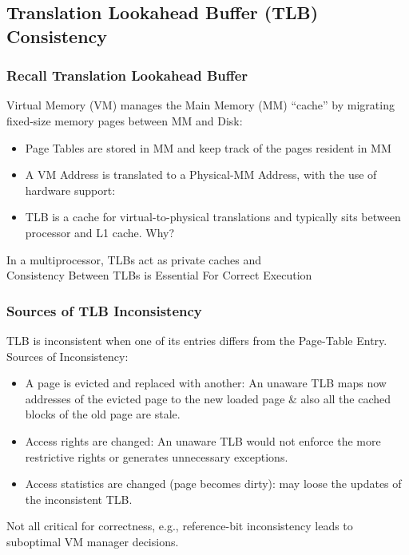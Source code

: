 \documentclass{beamer}
\renewcommand{\emph}[1]{\textcolor{structure}{#1}}
\newcommand{\emp}[1]{\textcolor{DikuRed}{ #1}}
\begin{document}
\subsection{Translation Lookahead Buffer (TLB) Consistency}
\begin{frame}[fragile,t]
\frametitle{Recall Translation Lookahead Buffer}
\bigskip

\emph{Virtual Memory (VM) manages the Main Memory (MM) ``cache'' by 
migrating fixed-size memory pages between MM and Disk:}
\begin{itemize} 
    \item Page Tables are stored in MM and keep track of the pages resident in MM 
    \item A VM Address is translated to a Physical-MM Address,
            with the use of \emp{hardware support}:
    \item TLB is a cache for virtual-to-physical translations and typically sits 
            between processor and L1 cache. \alert{Why?}
\end{itemize} 
\bigskip

In a multiprocessor, TLBs act as private caches and\\
\alert{Consistency Between TLBs is Essential For Correct Execution}
\end{frame}

\begin{frame}[fragile,t]
\frametitle{Sources of TLB Inconsistency}
\bigskip

TLB is inconsistent when one of its entries differs from the Page-Table Entry.
\emp{Sources of Inconsistency:}
\begin{itemize} 
    \item A page is evicted and replaced with another: An unaware TLB
            maps now addresses of the evicted page to the new
            loaded page \& also all the cached blocks of the old page are stale.
    \item Access rights are changed: An unaware TLB would not enforce the
            more restrictive rights or generates unnecessary exceptions.
    \item Access statistics are changed (page becomes dirty): may loose the
            updates of the inconsistent TLB. 
\end{itemize} 
\bigskip

Not all critical for correctness, e.g., reference-bit inconsistency 
leads to suboptimal VM manager decisions.

\end{frame}
\end{document}
